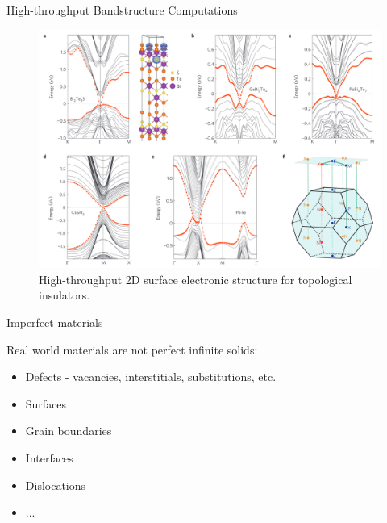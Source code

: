 \documentclass[aspectratio=169]{beamer}
\begin{document}
    \begin{frame}{High-throughput Bandstructure Computations}
        \begin{figure}
            \centering
            \includegraphics[width=0.5\linewidth]{lectures/figures/8_HT_Bandstructure.png}
            \caption{High-throughput 2D surface electronic structure for topological insulators.\cite{yangSearchModelTopological2012}}
        \end{figure}
    \end{frame}

    \begin{frame}{Imperfect materials}

        Real world materials are not perfect infinite solids:
        \begin{itemize}
            \item Defects - vacancies, interstitials, substitutions, etc.
            \item Surfaces
            \item Grain boundaries
            \item Interfaces
            \item Dislocations
            \item ...
        \end{itemize}

    \end{frame}
\end{document}
